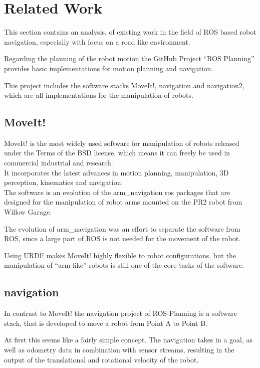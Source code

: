 \chapter{Related Work}
\label{relatedwork}

This section contains an analysis, of existing work in the field of ROS based robot navigation, especially with focus on a road like environment.

Regarding the planning of the robot motion the GitHub Project ``ROS Planning'' provides basic implementations for motion planning and navigation\cite{rosplanning}.

This project includes the software stacks MoveIt!, navigation and navigation2, which are all implementations for the manipulation of robots.\\
\section{MoveIt!}
MoveIt! is the most widely used software for manipulation of robots released under the Terms of the BSD license, which means it can freely be used in commercial industrial and research\cite{moveit}.\\
It incorporates the latest advances in motion planning, manipulation, 3D perception, kinematics and navigation.\\

The software is an evolution of the arm\_navigation ros packages that are designed for the manipulation of robot arms mounted on the PR2 robot from Willow Garage\cite{chitta2012moveit}\cite{willow}.

The evolution of arm\_navigation was an effort to separate the software from ROS, since a large part of ROS is not needed for the movement of the robot. 

Using URDF makes MoveIt! highly flexible to robot configurations, but the manipulation of ``arm-like'' robots is still one of the core tasks of the software.

\section{navigation}
In contrast to MoveIt! the navigation project of ROS-Planning is a software stack, that is developed to move a robot from Point A to Point B.

At first this seems like a fairly simple concept. The navigation takes in a goal, as well as odometry data in combination with sensor streams, resulting in the output of the translational and rotational velocity of the robot.


